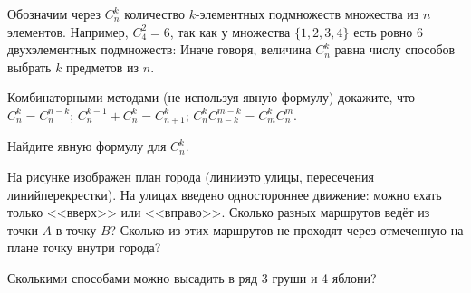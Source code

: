 \documentclass[a4paper,12pt,fleqn]{article}
\begin{document}

Обозначим через $C_n^k$ количество $k$-элементных подмножеств множества из $n$ элементов. Например, $C_4^2 = 6$, так как у множества $\{1, 2, 3, 4\}$ есть ровно 6 двухэлементных подмножеств:
Иначе говоря, величина $C_n^k$ равна числу способов выбрать $k$ предметов из $n$.

Комбинаторными методами (не используя явную формулу) докажите, что\\
$C_n^k=C_n^{n-k}$;
$C_n^{k-1}+C_n^k=C_{n+1}^k$;
$C_n^k C_{n-k}^{m-k}=C_m^k C_n^m$.

Найдите явную формулу для $C_n^k$.

\vspace{-4mm}

На рисунке изображен план города
(линии\т это улицы, пересечения линий\т перекрестки).
На улицах введено одностороннее движение: можно
ехать только <<вверх>> или <<вправо>>. Сколько разных
маршрутов ведёт из точки $A$ в точку $B$?
Сколько из этих маршрутов не проходят через отмеченную на плане
точку внутри города?

Сколькими способами можно высадить в ряд 3 груши и 4 яблони?

\vspace{-4mm}
\end{document}
